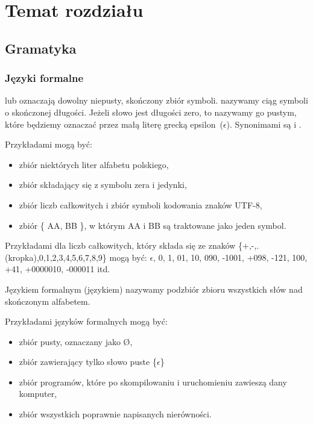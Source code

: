 \chapter{Temat rozdziału }

\section{Gramatyka}
\subsection{Języki formalne}
 lub  oznaczają dowolny niepusty, skończony zbiór symboli. 
 nazywamy ciąg symboli  o skończonej długości.
Jeżeli słowo jest długości zero, to nazywamy go  pustym,
  które będziemy oznaczać przez małą literę grecką epsilon~($\epsilon$).
  Synonimami  są  i . \cite{aho}   

  Przykładami  mogą być:
    \begin{itemize}
     \item  zbiór niektórych liter alfabetu polskiego,
     \item  zbiór składający się z symbolu zera i jedynki,
     \item  zbiór liczb całkowitych i zbiór symboli kodowania znaków UTF-8,
     \item  zbiór \{ AA, BB \}, w którym AA i BB są traktowane jako jeden symbol.
    \end{itemize}

  Przykładami   dla  liczb całkowitych, który składa się ze znaków \{+,-,.(kropka),0,1,2,3,4,5,6,7,8,9\} mogą być:
  $\epsilon$, 0, 1, 01, 10, 090, -1001, +098, -121, 100, +41, +0000010, -000011
itd.
  


    Językiem formalnym (językiem) nazywamy podzbiór zbioru wszystkich słów nad skończonym alfabetem.
    


  Przykładami języków formalnych mogą być:
    \begin{itemize}
     \item zbiór pusty, oznaczany jako \O,
     \item zbiór zawierający tylko słowo puste  \{$\epsilon$\}
      \item zbiór programów, które po skompilowaniu i uruchomieniu zawieszą dany komputer,
      \item zbiór wszystkich poprawnie napisanych nierówności.
    \end{itemize}

